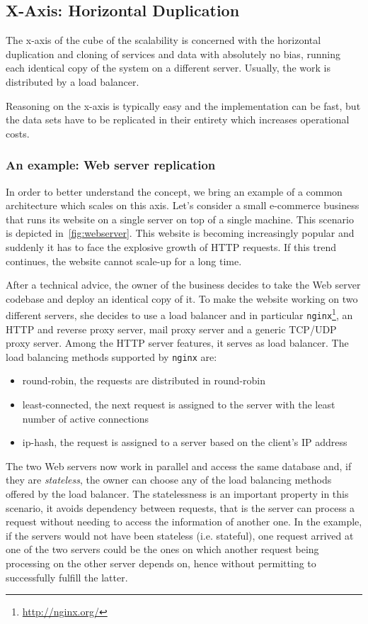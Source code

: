 \subsection{X-Axis: Horizontal Duplication}
\label{sec:x-axis}

The x-axis of the cube of the scalability is concerned with the horizontal
duplication and cloning of services and data with absolutely no bias, running
each identical copy of the system on a different server. Usually, the work is
distributed by a load balancer.

Reasoning on the x-axis is typically easy and the implementation can be fast,
but the data sets have to be replicated in their entirety which increases
operational costs.

\subsubsection{An example: Web server replication}
In order to better understand the concept, we bring an example of a common
architecture which scales on this axis. Let's consider a small e-commerce
business that runs its website on a single server on top of a single machine.
This scenario is depicted in~\autoref{fig:webserver}. This website is becoming
increasingly popular and suddenly it has to face the explosive growth of HTTP
requests. If this trend continues, the website cannot scale-up for a long time.

After a technical advice, the owner of the business decides to take the Web
server codebase and deploy an identical copy of it. To make the website working
on two different servers, she decides to use a load balancer and in particular
\texttt{nginx}\footnote{\url{http://nginx.org/}}, an HTTP and reverse proxy
server, mail proxy server and a generic TCP/UDP proxy server. Among the HTTP
server features, it serves as load balancer. The load balancing methods
supported by \texttt{nginx} are:

\begin{itemize}
  \item round-robin, the requests are distributed in round-robin
  \item least-connected, the next request is assigned to the server with the
  least number of active connections
  \item ip-hash, the request is assigned to a server based on the client's IP
  address
\end{itemize}

The two Web servers now work in parallel and access the same database and, if
they are \emph{stateless}, the owner can choose any of the load balancing
methods offered by the load balancer. The statelessness is an important property
in this scenario, it avoids dependency between requests, that is the server can
process a request without needing to access the information of another one. In
the example, if the servers would not have been stateless (i.e. stateful), one
request arrived at one of the two servers could be the ones on which another
request being processing on the other server depends on, hence without
permitting to successfully fulfill the latter.

